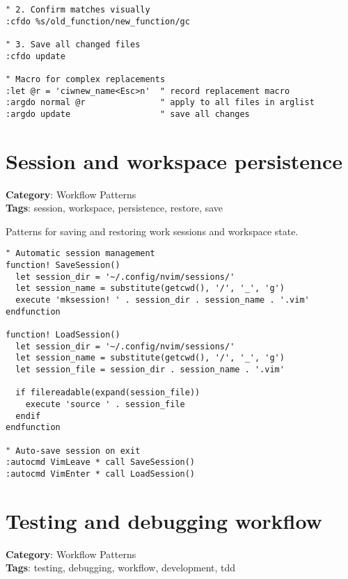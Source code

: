 {{{{{{{{{{{{{{{{{{\begin{Exa*}{}
\begin{Verbatim}[fontsize=\footnotesize, breaklines, breakanywhere]
" 2. Confirm matches visually
:cfdo %s/old_function/new_function/gc

" 3. Save all changed files
:cfdo update

" Macro for complex replacements
:let @r = 'ciwnew_name<Esc>n'  " record replacement macro
:argdo normal @r               " apply to all files in arglist
:argdo update                  " save all changes
\end{Verbatim}
\end{Exa*}

\section{Session and workspace persistence}

\textbf{Category}: Workflow Patterns\\ \textbf{Tags}: session, workspace, persistence, restore, save
\vspace{0.5cm}

Patterns for saving and restoring work sessions and workspace state.

\begin{Exa*}{}
\begin{Verbatim}[fontsize=\footnotesize, breaklines, breakanywhere]
" Automatic session management
function! SaveSession()
  let session_dir = '~/.config/nvim/sessions/'
  let session_name = substitute(getcwd(), '/', '_', 'g')
  execute 'mksession! ' . session_dir . session_name . '.vim'
endfunction

function! LoadSession()
  let session_dir = '~/.config/nvim/sessions/'
  let session_name = substitute(getcwd(), '/', '_', 'g')
  let session_file = session_dir . session_name . '.vim'
  
  if filereadable(expand(session_file))
    execute 'source ' . session_file
  endif
endfunction

" Auto-save session on exit
:autocmd VimLeave * call SaveSession()
:autocmd VimEnter * call LoadSession()
\end{Verbatim}
\end{Exa*}

\section{Testing and debugging workflow}

\textbf{Category}: Workflow Patterns\\ \textbf{Tags}: testing, debugging, workflow, development, tdd
\vspace{0.5cm}

}}}}}}}}}}}}}}}}}}

